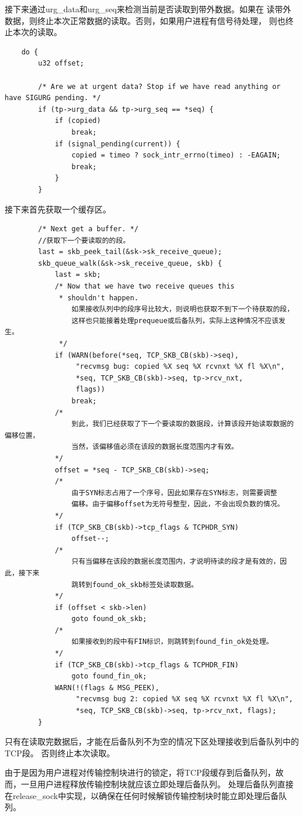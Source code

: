    接下来通过urg\_data和urg\_seq来检测当前是否读取到带外数据。如果在
    读带外数据，则终止本次正常数据的读取。否则，如果用户进程有信号待处理，
    则也终止本次的读取。
\begin{verbatim}
    do {
        u32 offset;

        /* Are we at urgent data? Stop if we have read anything or have SIGURG pending. */
        if (tp->urg_data && tp->urg_seq == *seq) {
            if (copied)
                break;
            if (signal_pending(current)) {
                copied = timeo ? sock_intr_errno(timeo) : -EAGAIN;
                break;
            }
        }
\end{verbatim}

    接下来首先获取一个缓存区。
\begin{verbatim}
		/* Next get a buffer. */
		//获取下一个要读取的的段。
		last = skb_peek_tail(&sk->sk_receive_queue);
		skb_queue_walk(&sk->sk_receive_queue, skb) {
			last = skb;
			/* Now that we have two receive queues this
			 * shouldn't happen.
				如果接收队列中的段序号比较大，则说明也获取不到下一个待获取的段，
				这样也只能接着处理prequeue或后备队列，实际上这种情况不应该发生。
			 */
			if (WARN(before(*seq, TCP_SKB_CB(skb)->seq),
				 "recvmsg bug: copied %X seq %X rcvnxt %X fl %X\n",
				 *seq, TCP_SKB_CB(skb)->seq, tp->rcv_nxt,
				 flags))
				break;
			/*
				到此，我们已经获取了下一个要读取的数据段，计算该段开始读取数据的偏移位置，
				当然，该偏移值必须在该段的数据长度范围内才有效。
			*/
			offset = *seq - TCP_SKB_CB(skb)->seq;	
			/*
				由于SYN标志占用了一个序号，因此如果存在SYN标志，则需要调整
				偏移。由于偏移offset为无符号整型，因此，不会出现负数的情况。
			*/
			if (TCP_SKB_CB(skb)->tcp_flags & TCPHDR_SYN)
				offset--;
			/*
				只有当偏移在该段的数据长度范围内，才说明待读的段才是有效的，因此，接下来
				跳转到found_ok_skb标签处读取数据。
			*/
			if (offset < skb->len)
				goto found_ok_skb;
			/*
				如果接收到的段中有FIN标识，则跳转到found_fin_ok处处理。
			*/
			if (TCP_SKB_CB(skb)->tcp_flags & TCPHDR_FIN)
				goto found_fin_ok;
			WARN(!(flags & MSG_PEEK),
			     "recvmsg bug 2: copied %X seq %X rcvnxt %X fl %X\n",
			     *seq, TCP_SKB_CB(skb)->seq, tp->rcv_nxt, flags);
		}
\end{verbatim}

    只有在读取完数据后，才能在后备队列不为空的情况下区处理接收到后备队列中的TCP段。
    否则终止本次读取。

    由于是因为用户进程对传输控制块进行的锁定，将TCP段缓存到后备队列，故而，一旦用户进程释放传输控制块就应该立即处理后备队列。
    处理后备队列直接在release\_sock中实现，以确保在任何时候解锁传输控制块时能立即处理后备队列。

